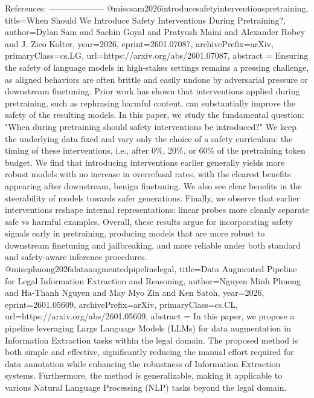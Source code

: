         References:
        --------------------
        @misc{sam2026introducesafetyinterventionspretraining,
      title={When Should We Introduce Safety Interventions During Pretraining?}, 
      author={Dylan Sam and Sachin Goyal and Pratyush Maini and Alexander Robey and J. Zico Kolter},
      year={2026},
      eprint={2601.07087},
      archivePrefix={arXiv},
      primaryClass={cs.LG},
      url={https://arxiv.org/abs/2601.07087},
      abstract = {Ensuring the safety of language models in high-stakes settings remains a pressing challenge, as aligned behaviors are often brittle and easily undone by adversarial pressure or downstream finetuning. Prior work has shown that interventions applied during pretraining, such as rephrasing harmful content, can substantially improve the safety of the resulting models. In this paper, we study the fundamental question: "When during pretraining should safety interventions be introduced?" We keep the underlying data fixed and vary only the choice of a safety curriculum: the timing of these interventions, i.e., after 0\%, 20\%, or 60\% of the pretraining token budget. We find that introducing interventions earlier generally yields more robust models with no increase in overrefusal rates, with the clearest benefits appearing after downstream, benign finetuning. We also see clear benefits in the steerability of models towards safer generations. Finally, we observe that earlier interventions reshape internal representations: linear probes more cleanly separate safe vs harmful examples. Overall, these results argue for incorporating safety signals early in pretraining, producing models that are more robust to downstream finetuning and jailbreaking, and more reliable under both standard and safety-aware inference procedures.}
}@misc{phuong2026dataaugmentedpipelinelegal,
      title={Data Augmented Pipeline for Legal Information Extraction and Reasoning}, 
      author={Nguyen Minh Phuong and Ha-Thanh Nguyen and May Myo Zin and Ken Satoh},
      year={2026},
      eprint={2601.05609},
      archivePrefix={arXiv},
      primaryClass={cs.CL},
      url={https://arxiv.org/abs/2601.05609},
      abstract = {In this paper, we propose a pipeline leveraging Large Language Models (LLMs) for data augmentation in Information Extraction tasks within the legal domain. The proposed method is both simple and effective, significantly reducing the manual effort required for data annotation while enhancing the robustness of Information Extraction systems. Furthermore, the method is generalizable, making it applicable to various Natural Language Processing (NLP) tasks beyond the legal domain.}
}
